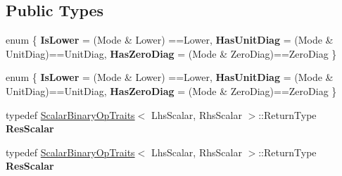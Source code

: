 \subsection*{Public Types}
\begin{DoxyCompactItemize}
\item 
\mbox{\label{struct_eigen_1_1internal_1_1packed__triangular__matrix__vector__product_3_01_index_00_01_mode_00f4369f0f3f5b783c4128c16d4e97f7b3_acd0dd480705e2e7d1903b897e2d8e3cf}} 
enum \{ {\bfseries Is\+Lower} = (Mode \& Lower) ==Lower, 
{\bfseries Has\+Unit\+Diag} = (Mode \& Unit\+Diag)==Unit\+Diag, 
{\bfseries Has\+Zero\+Diag} = (Mode \& Zero\+Diag)==Zero\+Diag
 \}
\item 
\mbox{\label{struct_eigen_1_1internal_1_1packed__triangular__matrix__vector__product_3_01_index_00_01_mode_00f4369f0f3f5b783c4128c16d4e97f7b3_ab60271da20a65fc36708d2aa85680bd9}} 
enum \{ {\bfseries Is\+Lower} = (Mode \& Lower) ==Lower, 
{\bfseries Has\+Unit\+Diag} = (Mode \& Unit\+Diag)==Unit\+Diag, 
{\bfseries Has\+Zero\+Diag} = (Mode \& Zero\+Diag)==Zero\+Diag
 \}
\item 
\mbox{\label{struct_eigen_1_1internal_1_1packed__triangular__matrix__vector__product_3_01_index_00_01_mode_00f4369f0f3f5b783c4128c16d4e97f7b3_a234b457120cea455a9f7c0981bb82343}} 
typedef \hyperlink{group___core___module_struct_eigen_1_1_scalar_binary_op_traits}{Scalar\+Binary\+Op\+Traits}$<$ Lhs\+Scalar, Rhs\+Scalar $>$\+::Return\+Type {\bfseries Res\+Scalar}
\item 
\mbox{\label{struct_eigen_1_1internal_1_1packed__triangular__matrix__vector__product_3_01_index_00_01_mode_00f4369f0f3f5b783c4128c16d4e97f7b3_a234b457120cea455a9f7c0981bb82343}} 
typedef \hyperlink{group___core___module_struct_eigen_1_1_scalar_binary_op_traits}{Scalar\+Binary\+Op\+Traits}$<$ Lhs\+Scalar, Rhs\+Scalar $>$\+::Return\+Type {\bfseries Res\+Scalar}
\end{DoxyCompactItemize}
